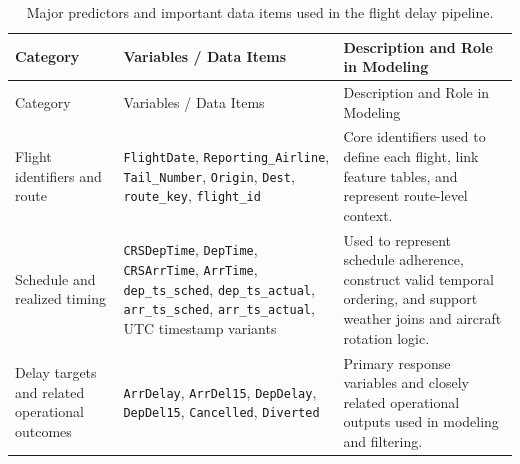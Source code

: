 \documentclass[
  letterpaper,
  DIV=11,
  numbers=noendperiod]{scrartcl}
\begin{document}
\begin{longtable}[]{@{}
  >{\raggedright\arraybackslash}p{}
  >{\raggedright\arraybackslash}p{}
  >{\raggedright\arraybackslash}p{}@{}}
\caption{Major predictors and important data items used in the flight
delay pipeline.}\label{tbl-predictors}\tabularnewline
\toprule\noalign{}
\begin{minipage}[b]{\linewidth}\raggedright
Category
\end{minipage} & \begin{minipage}[b]{\linewidth}\raggedright
Variables / Data Items
\end{minipage} & \begin{minipage}[b]{\linewidth}\raggedright
Description and Role in Modeling
\end{minipage} \\
\midrule\noalign{}
\endfirsthead
\toprule\noalign{}
\begin{minipage}[b]{\linewidth}\raggedright
Category
\end{minipage} & \begin{minipage}[b]{\linewidth}\raggedright
Variables / Data Items
\end{minipage} & \begin{minipage}[b]{\linewidth}\raggedright
Description and Role in Modeling
\end{minipage} \\
\midrule\noalign{}
\endhead
\bottomrule\noalign{}
\endlastfoot
Flight identifiers and route & \texttt{FlightDate},
\texttt{Reporting\_Airline}, \texttt{Tail\_Number}, \texttt{Origin},
\texttt{Dest}, \texttt{route\_key}, \texttt{flight\_id} & Core
identifiers used to define each flight, link feature tables, and
represent route-level context. \\
Schedule and realized timing & \texttt{CRSDepTime}, \texttt{DepTime},
\texttt{CRSArrTime}, \texttt{ArrTime}, \texttt{dep\_ts\_sched},
\texttt{dep\_ts\_actual}, \texttt{arr\_ts\_sched},
\texttt{arr\_ts\_actual}, UTC timestamp variants & Used to represent
schedule adherence, construct valid temporal ordering, and support
weather joins and aircraft rotation logic. \\
Delay targets and related operational outcomes & \texttt{ArrDelay},
\texttt{ArrDel15}, \texttt{DepDelay}, \texttt{DepDel15},
\texttt{Cancelled}, \texttt{Diverted} & Primary response variables and
closely related operational outputs used in modeling and filtering. \\

\end{longtable}
\end{document}
